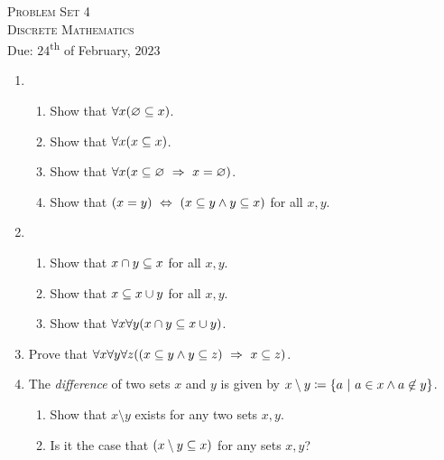 




\begin{center}
    \textsc{\huge Problem Set 4}\\
    \textsc{Discrete Mathematics}\\
    {\color{gruvred}Due: $24$\textsuperscript{th} of February, $2023$}
\end{center}

\begin{enumerate}
    \item
        \begin{enumerate}
            \item
                Show that \(\forall x \pn*{\emptyset \subseteq x}\).
            \item
                Show that \(\forall x \pn*{x \subseteq x}\).
            \item
                Show that \(\forall x \pn*{x \subseteq \emptyset \implies x = \emptyset}\).
            \item
                Show that \(\pn*{x = y} \iff \pn*{x \subseteq y \meet y \subseteq x}\) for all \(x, y\).
        \end{enumerate}
    \item
        \begin{enumerate}
            \item
                Show that \(x \cap y \subseteq x\) for all \(x, y\).
            \item
                Show that \(x \subseteq x \cup y\) for all \(x, y\).
            \item
                Show that \(\forall x \forall y \pn*{x \intersect y \subseteq x \union y}\).
        \end{enumerate}
    \item
        Prove that \(\forall x \forall y \forall z \pn*{\pn*{x \subseteq y \meet y \subseteq z}
                                                        \implies x \subseteq z}\).
    \item
        The \emph{difference} of two sets \(x\) and \(y\) is given by
        \(x \setminus y \defn \set*{a \suchthat a \in x \meet a \not \in y}\).
        \begin{enumerate}
            \item
                Show that \(x \setminus y\) exists for any two sets \(x, y\).
            \item
                Is it the case that \(\pn*{x \setminus y \subseteq x}\) for any sets \(x, y\)?

\end{enumerate}
\end{enumerate}
